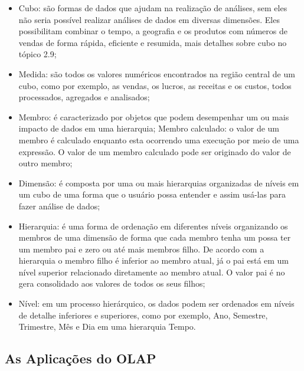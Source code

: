 \begin{itemize}

    \item Cubo: são formas de dados que ajudam na realização de análises, sem eles não seria possível realizar análises de dados em diversas dimensões. Eles possibilitam combinar o tempo, a geografia e os produtos com números de vendas de forma r\'{a}pida, eficiente e resumida, mais detalhes sobre cubo no tópico 2.9;
    
    \item Medida: são todos os valores numéricos encontrados na região central de um cubo, como por exemplo, as vendas, os lucros, as receitas e os custos, todos processados, agregados e analisados;
    
    \item Membro: \'{e} caracterizado por objetos que podem desempenhar um ou mais impacto de dados em uma hierarquia;
    Membro calculado: o valor de um membro é calculado enquanto esta ocorrendo uma execução por meio de uma expressão. O valor de um membro calculado pode ser originado do valor de outro membro;
    
    \item Dimensão: \'{e} composta por uma ou mais hierarquias organizadas de níveis em um cubo de uma forma que o usuário possa entender e assim usá-las para fazer análise de dados;
    
    \item Hierarquia: é uma forma de ordenação em diferentes níveis organizando os membros de uma dimensão de forma que cada membro tenha um possa ter um membro pai e zero ou até mais membros filho. De acordo com a hierarquia o membro filho é inferior ao membro atual, já o pai está em um nível superior relacionado diretamente ao membro atual. O valor pai é no gera consolidado aos valores de todos os seus filhos;
    
    \item Nível: em um processo hierárquico, os dados podem ser ordenados em níveis de detalhe inferiores e superiores, como por exemplo, Ano, Semestre, Trimestre, Mês e Dia em uma hierarquia Tempo.

\end{itemize}

\subsection{As Aplica\c{c}ões do OLAP}

